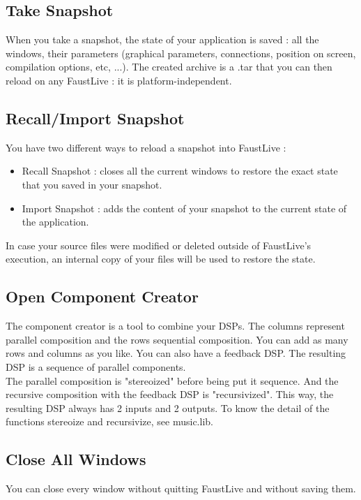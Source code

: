 \documentclass[a4paper]{article}
\begin{document}
\subsection{Take Snapshot}
 When you take a snapshot, the state of your application is saved : all the windows, their parameters (graphical parameters, connections, position on screen, compilation options, etc, ...). The created archive is a .tar that you can then reload on any FaustLive : it is platform-independent. 

\subsection{Recall/Import Snapshot}
You have two different ways to reload a snapshot into FaustLive : 
\begin{itemize}
\item Recall Snapshot : closes all the current windows to restore the exact state that you saved in your snapshot.
\item Import Snapshot : adds the content of your snapshot to the current state of the application. 
\end{itemize}

In case your source files were modified or deleted outside of FaustLive's execution, an internal copy of your files will be used to restore the state. 

\subsection{Open Component Creator}
The component creator is a tool to combine your DSPs. The columns represent parallel composition and the rows sequential composition. You can add as many rows and columns as you like. You can also have a feedback DSP. The resulting DSP is a sequence of parallel components. \\

The parallel composition is "stereoized" before being put it sequence. And the recursive composition with the feedback DSP is "recursivized". This way, the resulting DSP always has 2 inputs and 2 outputs. To know the detail of the functions stereoize and recursivize, see music.lib. 


\subsection{Close All Windows}
You can close every window without quitting FaustLive and without saving them.
\end{document}
